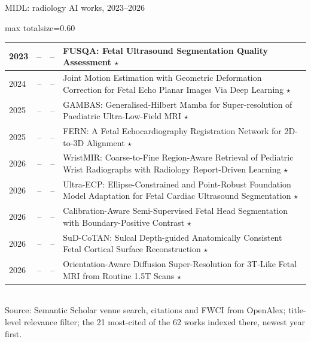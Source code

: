 \documentclass[aspectratio=169]{beamer}
\begin{document}
\begin{frame}[category=Conferences]{MIDL: radiology AI works, 2023--2026}
\begin{adjustbox}{max totalsize={\textwidth}{0.60\textheight}}
\begin{tabular}{|l|r|r|>{\raggedright\arraybackslash}p{}|}
2023 & -- & -- & FUSQA: Fetal Ultrasound Segmentation Quality Assessment $\star$ \\ \hline
2024 & -- & -- & Joint Motion Estimation with Geometric Deformation Correction for Fetal Echo Planar Images Via Deep Learning $\star$ \\ \hline
2025 & -- & -- & GAMBAS: Generalised-Hilbert Mamba for Super-resolution of Paediatric Ultra-Low-Field MRI $\star$ \\ \hline
2025 & -- & -- & FERN: A Fetal Echocardiography Registration Network for 2D-to-3D Alignment $\star$ \\ \hline
2026 & -- & -- & WristMIR: Coarse-to-Fine Region-Aware Retrieval of Pediatric Wrist Radiographs with Radiology Report-Driven Learning $\star$ \\ \hline
2026 & -- & -- & Ultra-ECP: Ellipse-Constrained and Point-Robust Foundation Model Adaptation for Fetal Cardiac Ultrasound Segmentation $\star$ \\ \hline
2026 & -- & -- & Calibration-Aware Semi-Supervised Fetal Head Segmentation with Boundary-Positive Contrast $\star$ \\ \hline
2026 & -- & -- & SuD-CoTAN: Sulcal Depth-guided Anatomically Consistent Fetal Cortical Surface Reconstruction $\star$ \\ \hline
2026 & -- & -- & Orientation-Aware Diffusion Super-Resolution for 3T-Like Fetal MRI from Routine 1.5T Scans $\star$ \\ \hline
\end{tabular}
\end{adjustbox}
\\[2pt]
{\tiny Source: Semantic Scholar venue search, citations and FWCI from OpenAlex; title-level relevance filter; the 21 most-cited of the 62 works indexed there, newest year first.}
\end{frame}
\end{document}
